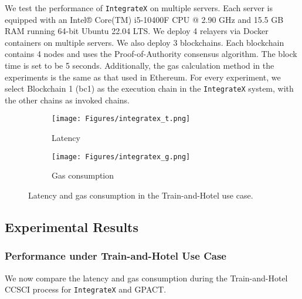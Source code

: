 
We test the performance of \texttt{IntegrateX} on multiple servers.
Each server is equipped with an Intel® Core(TM) i5-10400F CPU @ 2.90 GHz and 15.5 GB RAM running 64-bit Ubuntu 22.04 LTS. 
We deploy 4 relayers via Docker containers on multiple servers.
We also deploy 3 blockchains. 
Each blockchain contains 4 nodes and uses the Proof-of-Authority consensus algorithm. 
The block time is set to be 5 seconds. 
Additionally, the gas calculation method in the experiments is the same as that used in Ethereum. 
For every experiment, we select Blockchain 1 (bc1) as the execution chain in the \texttt{IntegrateX} system, with the other chains as invoked chains.

\begin{figure}[t]
    \centering
    \begin{subfigure}[b]{0.24\textwidth}
        \centering
        \texttt{[image: Figures/integratex\_t.png]}  %
        \caption{Latency}
        \label{ixtime}
    \end{subfigure}
    \hfill
    \begin{subfigure}[b]{0.24\textwidth}
        \centering
        \texttt{[image: Figures/integratex\_g.png]}  %
        \caption{Gas consumption}
        \label{ixgas}  %
    \end{subfigure}
    \vspace{-18pt}
    \caption{Latency and gas consumption in the Train-and-Hotel use case.}
    \label{integratex}  %
 
\end{figure}
\subsection{Experimental Results}
\subsubsection{Performance under Train-and-Hotel Use Case}
We now compare the latency and gas consumption during the Train-and-Hotel CCSCI process for \texttt{IntegrateX} and GPACT. 

